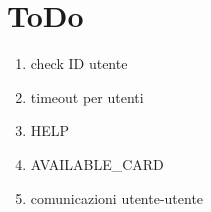 \documentclass[12pt,a4paper, titlepage]{article}
\begin{document}
\section{ToDo}
\begin{enumerate}
    \item check ID utente
    \item timeout per utenti
    \item HELP
    \item AVAILABLE\_CARD
    \item comunicazioni utente-utente
\end{enumerate}
\end{document}
